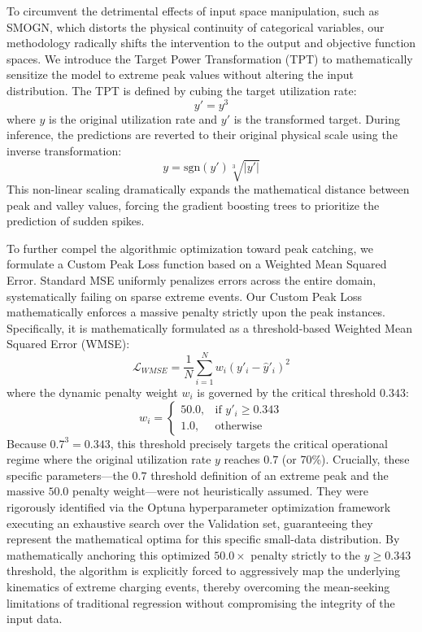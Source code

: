 \documentclass[pdflatex,sn-mathphys-num]{sn-jnl}%
\theoremstyle{thmstyleone}%
\theoremstyle{thmstyletwo}%
\theoremstyle{thmstylethree}%
\begin{document}
To circumvent the detrimental effects of input space manipulation, such as SMOGN, which distorts the physical continuity of categorical variables, our methodology radically shifts the intervention to the output and objective function spaces. We introduce the Target Power Transformation (TPT) to mathematically sensitize the model to extreme peak values without altering the input distribution. The TPT is defined by cubing the target utilization rate:
\begin{equation}
y' = y^3
\end{equation}
where $y$ is the original utilization rate and $y'$ is the transformed target. During inference, the predictions are reverted to their original physical scale using the inverse transformation:
\begin{equation}
y = \text{sgn}(y') \sqrt[3]{\vert y' \vert}
\end{equation}
This non-linear scaling dramatically expands the mathematical distance between peak and valley values, forcing the gradient boosting trees to prioritize the prediction of sudden spikes. 

To further compel the algorithmic optimization toward peak catching, we formulate a Custom Peak Loss function based on a Weighted Mean Squared Error. Standard MSE uniformly penalizes errors across the entire domain, systematically failing on sparse extreme events. Our Custom Peak Loss mathematically enforces a massive penalty strictly upon the peak instances. Specifically, it is mathematically formulated as a threshold-based Weighted Mean Squared Error (WMSE):
\begin{equation}
\mathcal{L}_{WMSE} = \frac{1}{N} \sum_{i=1}^{N} w_i \left( y'_i - \hat{y}'_i \right)^2
\end{equation}
where the dynamic penalty weight $w_i$ is governed by the critical threshold $0.343$:
\begin{equation}
w_i = \begin{cases} 50.0, & \text{if } y'_i \ge 0.343 \\ 1.0, & \text{otherwise} \end{cases}
\end{equation}
Because $0.7^3 = 0.343$, this threshold precisely targets the critical operational regime where the original utilization rate $y$ reaches $0.7$ (or 70\%). Crucially, these specific parameters---the $0.7$ threshold definition of an extreme peak and the massive $50.0$ penalty weight---were not heuristically assumed. They were rigorously identified via the Optuna hyperparameter optimization framework executing an exhaustive search over the Validation set, guaranteeing they represent the mathematical optima for this specific small-data distribution. By mathematically anchoring this optimized $50.0\times$ penalty strictly to the $y \ge 0.343$ threshold, the algorithm is explicitly forced to aggressively map the underlying kinematics of extreme charging events, thereby overcoming the mean-seeking limitations of traditional regression without compromising the integrity of the input data.
\end{document}
